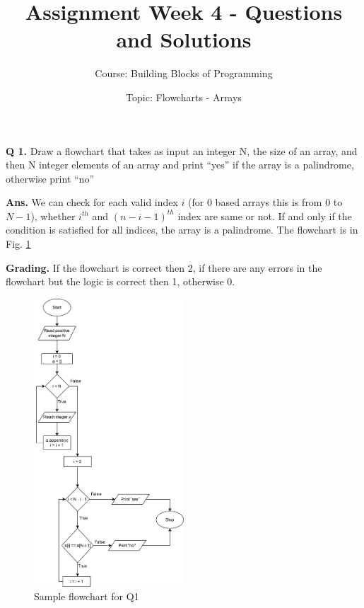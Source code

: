 \documentclass{article}
\title{Assignment Week 4 - Questions and Solutions}
\author{Course: Building Blocks of Programming}
\date{Topic: Flowcharts - Arrays}
\begin{document}
\maketitle

\begin{flushleft}

    \textbf{Q 1. } Draw a flowchart that takes as input an integer N, 
    the size of an array, and then N integer elements of an array and print “yes” 
    if the array is a palindrome, otherwise print “no”
    
    \end{flushleft}
    
    \begin{flushleft}
    
    \textbf{Ans. } We can check for each valid index $i$ (for 0 based arrays this is 
    from 0 to $N-1$), whether $i^{th}$ and $(n-i-1)^{th}$ index are same or not. If and only 
    if the condition is satisfied for all indices, the array is a palindrome. The flowchart is in 
    Fig. \ref{Q1}
    
    \end{flushleft}
    
    \begin{flushleft}
    
    \textbf{Grading. } If the flowchart is correct then 2, if there are any errors in the flowchart but 
    the logic is correct then 1, otherwise 0. 
    
    \end{flushleft}
    
    \begin{figure}[ht]
        \centering
        \includegraphics[width=0.5\textwidth]{Q1.png}
        \caption{Sample flowchart for Q1}
        \label{Q1}
    \end{figure}
\clearpage
\end{document}
